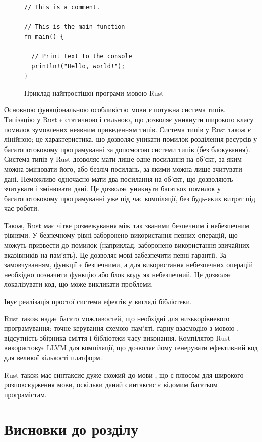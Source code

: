 \documentclass[oneside,14pt,a4paper,final]{myextreport}
\newcommand{\specialsection}[1]{\section*{#1}\addcontentsline{toc}{section}{#1}}
\newcommand{\chapterconslusions}{
  \clearpage
  \specialsection{Висновки до розділу \thechapter}
}
\begin{document}
\begin{figure}[h]
  \centering
  \begin{BVerbatim}
// This is a comment.

// This is the main function
fn main() {

  // Print text to the console
  println!("Hello, world!");
}
  \end{BVerbatim}
  \caption{Приклад найпростішої програми мовою Rust}\label{example:rust}
\end{figure}

Основною функціональною особливістю мови є потужна система типів. Типізацію у Rust є статичною і сильною, що дозволяє уникнути широкого класу помилок зумовлених неявним приведенням типів. Система типів у Rust також є лінійною; це характеристика, що дозволяє уникати помилок розділення ресурсів у багатопотоковому програмуванні за допомогою системи типів (без блокування). Система типів у Rust дозволяє мати лише одне посилання на об'єкт, за яким можна змінювати його, або безліч посилань, за якими можна лише зчитувати дані. Неможливо одночасно мати два посилання на об'єкт, що дозволяють зчитувати і змінювати дані. Це дозволяє уникнути багатьох помилок у багатопотоковому програмуванні уже під час компіляції, без будь-яких витрат під час роботи.

Також, Rust має чітке розмежування між так званими безпечним і небезпечним рівнями. У безпечному рівні заборонено використання певних операцій, що можуть призвести до помилок (наприклад, заборонено використання звичайних вказівників на пам'ять). Це дозволяє мові забезпечити певні гарантії. За замовчуванням, функції є безпечними, а для використання небезпечних операцій необхідно позначити функцію або блок коду як небезпечний. Це дозволяє локалізувати код, що може викликати проблеми.

Інує реалізація простої системи ефектів у вигляді бібліотеки.

Rust також надає багато можливостей, що необхідні для низькорівневого програмування: точне керування схемою пам'яті, гарну взаємодію з мовою \LangC{}, відсутність збірника сміття і бібліотеки часу виконання. Компілятор Rust використовує LLVM\cite{llvm} для компіляції, що дозволяє йому генерувати ефективний код для великої кількості платформ.

Rust також має синтаксис дуже схожий до мови \LangC{}, що є плюсом для широкого розповсюдження мови, оскільки даний синтаксис є відомим багатьом програмістам.

\chapterconslusions{}
\end{document}
